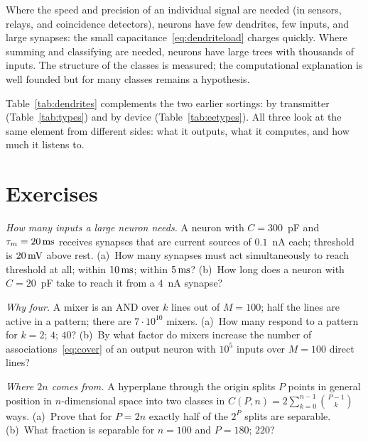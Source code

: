 \begin{keyblock}
\begin{proposition}
\label{prop:dendrites}
Where the speed and precision of an individual signal are needed (in sensors, relays, and coincidence detectors), neurons have few dendrites, few inputs, and large synapses: the small capacitance~\eqref{eq:dendriteload} charges quickly. Where summing and classifying are needed, neurons have large trees with thousands of inputs. The structure of the classes is measured; the computational explanation is well founded but for many classes remains a hypothesis.
\end{proposition}
\end{keyblock}

Table~\ref{tab:dendrites} complements the two earlier sortings: by transmitter (Table~\ref{tab:types}) and by device (Table~\ref{tab:eetypes}). All three look at the same element from different sides: what it outputs, what it computes, and how much it listens to.

\section{Exercises}

\begin{exercise}[\lvlA]
\label{ex:19:1}
\emph{How many inputs a large neuron needs.} A neuron with $C=300$~pF and $\tau_m=20\,\text{ms}$ receives synapses that are current sources of $0.1$~nA each; threshold is $20\,\text{mV}$ above rest. (a)~How many synapses must act simultaneously to reach threshold at all; within $10\,\text{ms}$; within $5\,\text{ms}$? (b)~How long does a neuron with $C=20$~pF take to reach it from a $4$~nA synapse?
\end{exercise}

\begin{exercise}[\lvlA]
\label{ex:19:2}
\emph{Why four.} A mixer is an AND over $k$ lines out of $M=100$; half the lines are active in a pattern; there are $7\cdot10^{10}$ mixers. (a)~How many respond to a pattern for $k=2$; $4$; $40$? (b)~By what factor do mixers increase the number of associations~\eqref{eq:cover} of an output neuron with $10^5$ inputs over $M=100$ direct lines?
\end{exercise}

\begin{exercise}[\lvlB]
\label{ex:19:3}
\emph{Where $2n$ comes from.} A hyperplane through the origin splits $P$ points in general position in $n$-dimensional space into two classes in $C(P,n)=2\sum_{k=0}^{n-1}\binom{P-1}{k}$ ways. (a)~Prove that for $P=2n$ exactly half of the $2^P$ splits are separable. (b)~What fraction is separable for $n=100$ and $P=180$; $220$?
\end{exercise}

